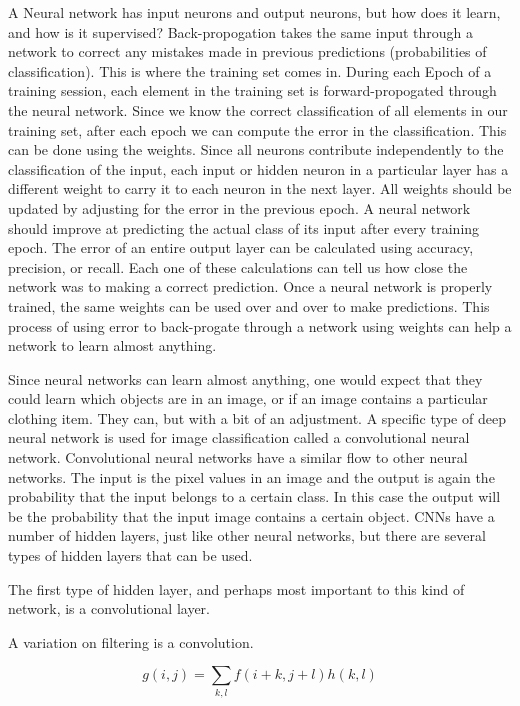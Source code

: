 \documentclass[12pt]{article} %
\begin{document}
 	A Neural network has input neurons and output neurons, but how does it learn, and how is it supervised? Back-propogation takes the same input through a network to correct any mistakes made in previous predictions (probabilities of classification). This is where the training set comes in. During each Epoch of a training session, each element in the training set is forward-propogated through the neural network. Since we know the correct classification of all elements in our training set, after each epoch we can compute the error in the classification. This can be done using the weights. Since all neurons contribute independently to the classification of the input, each input or hidden neuron in a particular layer has a different weight to carry it to each neuron in the next layer. All weights should be updated by adjusting for the error in the previous epoch. A neural network should improve at predicting the actual class of its input after every training epoch. The error of an entire output layer can be calculated using accuracy, precision, or recall. Each one of these calculations can tell us how close the network was to making a correct prediction. Once a neural network is properly trained, the same weights can be used over and over to make predictions. This process of using error to back-progate through a network using weights can help a network to learn almost anything.\cite{KubatMachineLearn} 
	
	Since neural networks can learn almost anything, one would expect that they could learn which objects are in an image, or if an image contains a particular clothing item. They can, but with a bit of an adjustment. A specific type of deep neural network is used for image classification called a convolutional neural network. Convolutional neural networks have a similar flow to other neural networks. The input is the pixel values in an image and the output is again the probability that the input belongs to a certain class. In this case the output will be the probability that the input image contains a certain object. CNNs have a number of hidden layers, just like other neural networks, but there are several types of hidden layers that can be used. 
	
	The first type of hidden layer, and perhaps most important to this kind of network, is a convolutional layer. 
	
	A variation on filtering is a convolution.
	
\[g(i,j) = \sum_{k,l} f(i + k, j + l)h(k, l)\]
	
\end{document}
